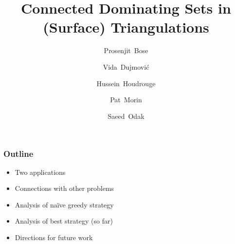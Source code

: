 \documentclass{beamer}
\title{Connected Dominating Sets in \newline (Surface) Triangulations}
\author{}
\author{%
  Prosenjit~Bose \and
  Vida~Dujmović \and
  Hussein~Houdrouge \and
  Pat~Morin \and
  Saeed~Odak}
\date{}
\begin{document}
\begin{frame}
    \maketitle
\end{frame}

\begin{frame}
  \frametitle{Outline}

  \begin{itemize}
    \item Two applications
    \item Connections with other problems
    \item Analysis of naïve greedy strategy
    \item Analysis of best strategy (so far)
    \item Directions for future work
  \end{itemize}
\end{frame}
\end{document}
